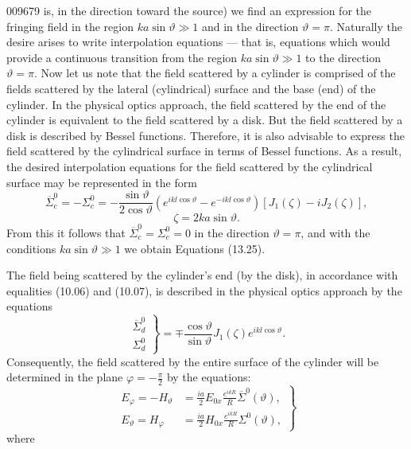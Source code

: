 \begin{scanpage}{0096}{79}
is, in the direction toward the source) we find an expression for the fringing field in the region $ka\sin\vartheta\gg1$ and in the direction $\vartheta=\pi$. Naturally the desire arises to write interpolation equations --- that is, equations which would provide a continuous transition from the region $ka\sin\vartheta\gg1$ to the direction $\vartheta=\pi$. Now let us note that the field scattered by a cylinder is comprised of the fields scattered by the lateral (cylindrical) surface and the base (end) of the cylinder. In the physical optics approach, the field scattered by the end of the cylinder is equivalent to the field scattered by a disk. But the field scattered by a disk is described by Bessel functions. Therefore, it is also advisable to express the field scattered by the cylindrical surface in terms of Bessel functions. As a result, the desired interpolation equations for the field scattered by the cylindrical surface may be represented in the form
\[\overline\Sigma_c^0=-\Sigma_c^0=-\frac{\sin\vartheta}{2\cos\vartheta}(e^{ikl\cos\vartheta}-e^{-ikl\cos\vartheta})[J_1(\zeta)-iJ_2(\zeta)],\tag{13.26}\]
\[\zeta=2ka\sin\vartheta.\]
From this it follows that $\overline\Sigma_c^0=\Sigma_c^0=0$ in the direction $\vartheta=\pi$, and with the conditions $ka\sin\vartheta\gg1$ we obtain Equations (13.25).

The field being scattered by the cylinder's end (by the disk), in accordance with equalities (10.06) and (10.07), is described in the physical optics approach by the equations
\[\left.\begin{matrix}\overline\Sigma_d^0\\\Sigma_d^0\end{matrix}\right\}=\mp\frac{\cos\vartheta}{\sin\vartheta}J_1(\zeta)e^{ikl\cos\vartheta}.\tag{13.27}\]
Consequently, the field scattered by the entire surface of the cylinder will be determined in the plane $\varphi=-\frac\pi2$ by the equations:
\[\left.\begin{aligned}E_\varphi=-H_\vartheta&=\frac{ia}2E_{0x}\frac{e^{ikR}}R\overline\Sigma^0(\vartheta),\\E_\vartheta=H_\varphi&=\frac{ia}2H_{0x}\frac{e^{ikR}}R\Sigma^0(\vartheta),\end{aligned}\right\}\tag{13.28}\]
where
\end{scanpage}

